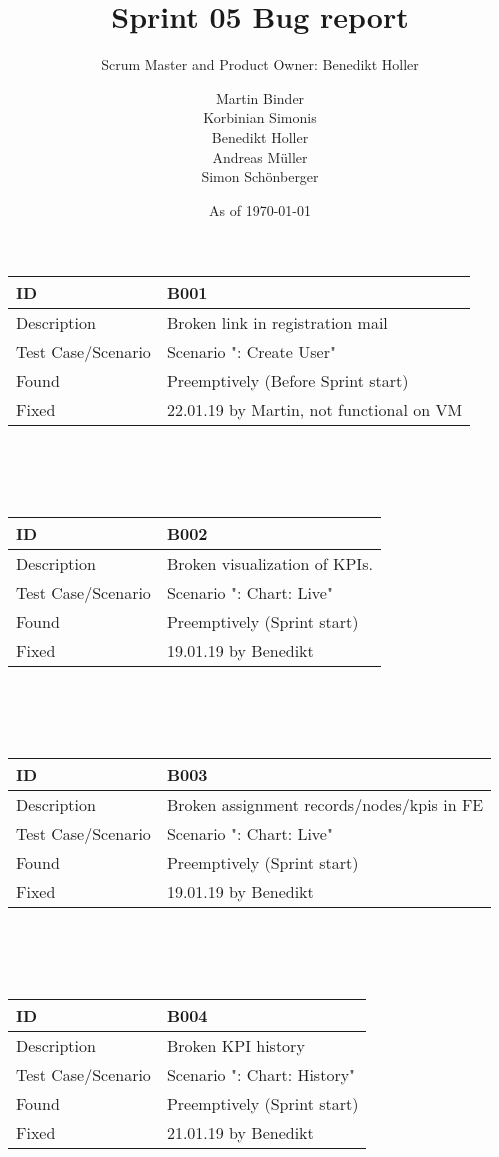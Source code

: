 \documentclass{scrreprt}
\title{Sprint 05 Bug report}
\subtitle{Scrum Master and Product Owner: Benedikt Holler}
\author{Martin Binder\\Korbinian Simonis\\Benedikt Holler\\Andreas M\"uller\\Simon Sch\"onberger}
\date{As of \today}
\begin{document}
	\maketitle
	\noindent \begin{tabularx}{12cm}{l|X}
		ID					& B001  \\
		\hline
		Description 		& 
		Broken link in registration mail \\
		\hline
		Test Case/Scenario	&  Scenario ": Create User"    \\
		\hline
		Found				&  	Preemptively (Before Sprint start)\\
		\hline
		Fixed				&   22.01.19 by Martin, not functional on VM \\ 
	\end{tabularx} 
	\\ \\ \\
	\begin{tabularx}{12cm}{l|X}
		ID					& B002  \\
		\hline
		Description 		& 
		Broken visualization of KPIs. \\
		\hline
		Test Case/Scenario	& Scenario ": Chart: Live"    \\
		\hline
		Found				&  	Preemptively (Sprint start)\\
		\hline
		Fixed				&   19.01.19 by Benedikt \\ 
	\end{tabularx}
	\\ \\ \\
	\begin{tabularx}{12cm}{l|X}
		ID					& B003  \\
		\hline
		Description 		& 
		Broken assignment records/nodes/kpis in FE \\
		\hline
		Test Case/Scenario	& Scenario ": Chart: Live"    \\
		\hline
		Found				&  	Preemptively (Sprint start)\\
		\hline
		Fixed				&   19.01.19 by Benedikt \\ 
	\end{tabularx}
	\\ \\ \\
	\begin{tabularx}{12cm}{l|X}
		ID					& B004  \\
		\hline
		Description 		& 
		Broken KPI history \\
		\hline
		Test Case/Scenario	& Scenario ": Chart: History"    \\
		\hline
		Found				&  	Preemptively (Sprint start)\\
		\hline
		Fixed				&   21.01.19 by Benedikt \\ 
	\end{tabularx}
\end{document}
